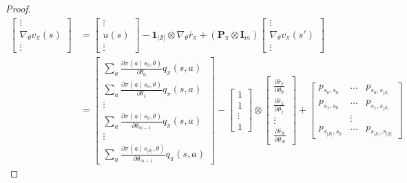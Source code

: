 ﻿\documentclass[11pt, a4paper]{report}
\begin{document}
\begin{proof}
\begin{align*}
\begin{bmatrix}
\vdots \\
\nabla_{\theta} v_{\pi}(s) \\
\vdots
\end{bmatrix}
&=
\begin{bmatrix}
\vdots \\
u(s) \\
\vdots
\end{bmatrix}
- \bm{1}_{|\mathcal{S}|} \otimes \nabla_{\theta} \bar{r}_{\pi} + (\bm{P}_{\pi} \otimes \bm{I}_m)
\begin{bmatrix}
\vdots \\
\nabla_{\theta} v_{\pi}(s') \\
\vdots
\end{bmatrix} \\
&=
\begin{bmatrix}
\sum_a \frac{\partial \pi(a \mid s_0, \theta)}{\partial \theta_0} q_{\pi}(s, a) \\
\sum_a \frac{\partial \pi(a \mid s_0, \theta)}{\partial \theta_1} q_{\pi}(s, a) \\
\vdots \\
\sum_a \frac{\partial \pi(a \mid s_0, \theta)}{\partial \theta_{m-1}} q_{\pi}(s, a) \\
\vdots \\
\sum_a \frac{\partial \pi(a \mid s_{|\mathcal{S}|}, \theta)}{\partial \theta_{m-1}} q_{\pi}(s, a)
\end{bmatrix}
-
\begin{bmatrix}
1 \\
1 \\
\vdots \\
1
\end{bmatrix}
\otimes
\begin{bmatrix}
\frac{\partial \bar{r}_{\pi}}{\partial \theta_0} \\
\frac{\partial \bar{r}_{\pi}}{\partial \theta_1} \\
\vdots \\
\frac{\partial \bar{r}_{\pi}}{\partial \theta_m}
\end{bmatrix}
+
\begin{bmatrix}
p_{s_0, s_0} & \dots & p_{s_0, s_{|\mathcal{S}|}} \\
p_{s_1, s_0} & \dots & p_{s_1, s_{|\mathcal{S}|}} \\
& \vdots & \\
p_{s_{|\mathcal{S}|}, s_0} & \dots & p_{s_{|\mathcal{S}|}, s_{|\mathcal{S}|}}

\end{bmatrix}
\end{align*}
\end{proof}
\end{document}
